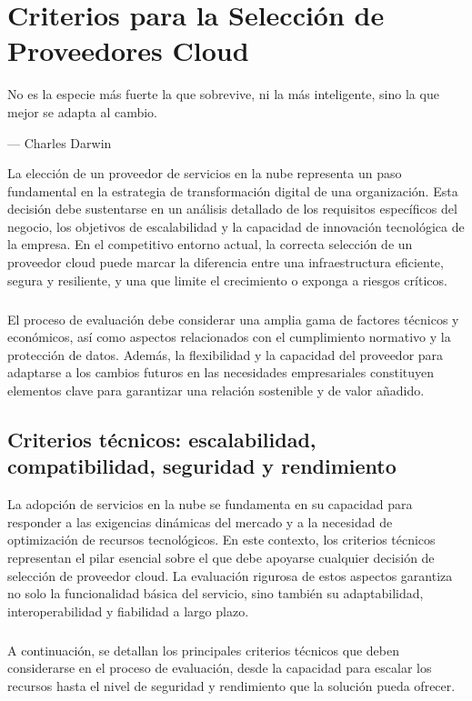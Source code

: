 {\justifying
	\chapter[Selección de proveedores Cloud]{Criterios para la Selección de Proveedores Cloud}
	\epigraph{No es la especie más fuerte la que sobrevive, ni la más inteligente, sino la que mejor se adapta al cambio.}
    {--- \textup{Charles Darwin}}

    La elección de un proveedor de servicios en la nube representa un paso fundamental en la estrategia de transformación digital de una organización. Esta decisión debe sustentarse en un análisis detallado de los requisitos específicos del negocio, los objetivos de escalabilidad y la capacidad de innovación tecnológica de la empresa. En el competitivo entorno actual, la correcta selección de un proveedor cloud puede marcar la diferencia entre una infraestructura eficiente, segura y resiliente, y una que limite el crecimiento o exponga a riesgos críticos.

    \paragraph{}El proceso de evaluación debe considerar una amplia gama de factores técnicos y económicos, así como aspectos relacionados con el cumplimiento normativo y la protección de datos. Además, la flexibilidad y la capacidad del proveedor para adaptarse a los cambios futuros en las necesidades empresariales constituyen elementos clave para garantizar una relación sostenible y de valor añadido.

    \section[Criterios técnicos de selección]{Criterios técnicos: escalabilidad, compatibilidad, seguridad y rendimiento}
        La adopción de servicios en la nube se fundamenta en su capacidad para responder a las exigencias dinámicas del mercado y a la necesidad de optimización de recursos tecnológicos. En este contexto, los criterios técnicos representan el pilar esencial sobre el que debe apoyarse cualquier decisión de selección de proveedor cloud. La evaluación rigurosa de estos aspectos garantiza no solo la funcionalidad básica del servicio, sino también su adaptabilidad, interoperabilidad y fiabilidad a largo plazo.

        \paragraph{}A continuación, se detallan los principales criterios técnicos que deben considerarse en el proceso de evaluación, desde la capacidad para escalar los recursos hasta el nivel de seguridad y rendimiento que la solución pueda ofrecer.

}
